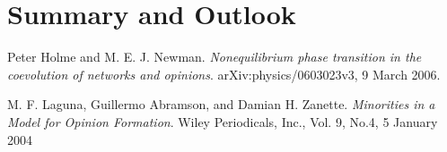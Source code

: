 \documentclass[11pt]{article}
\begin{document}
\section{Summary and Outlook}

\begin{thebibliography}{99}
 Peter Holme and M. E. J. Newman. \textit{Nonequilibrium phase transition in the coevolution of networks and opinions}. arXiv:physics/0603023v3, 9 March 2006.

 M. F. Laguna, Guillermo Abramson, and Damian H. Zanette. \textit{Minorities in a Model for Opinion Formation}. Wiley Periodicals, Inc., Vol. 9, No.4, 5 January 2004


\end{thebibliography} 
\end{document}
